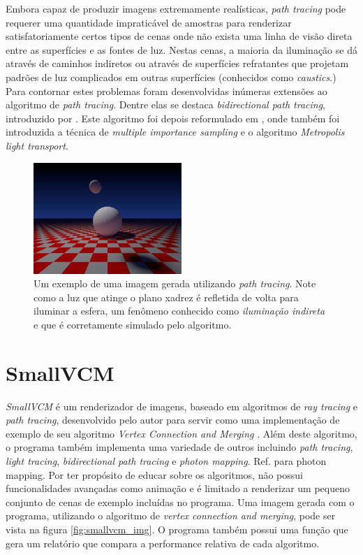 \documentclass[tg]{mdtufsm}
\newcommand{\todo}[1]{\textsf{\color{red}#1}}
\begin{document}
Embora capaz de produzir imagens extremamente realísticas, \emph{path tracing} pode requerer uma
quantidade impraticável de amostras para renderizar satisfatoriamente certos tipos de cenas onde não
exista uma linha de visão direta entre as superfícies e as fontes de luz. Nestas cenas, a maioria da
iluminação se dá através de caminhos indiretos ou através de superfícies refratantes que projetam
padrões de luz complicados em outras superfícies (conhecidos como \emph{caustics}.) Para contornar
estes problemas foram desenvolvidas inúmeras extensões ao algoritmo de \emph{path tracing}. Dentre
elas se destaca \emph{bidirectional path tracing}, introduzido por \citet{lafortune1993}. Este
algoritmo foi depois reformulado em \citep{veach1997}, onde também foi introduzida a técnica de
\emph{multiple importance sampling} e o algoritmo \emph{Metropolis light transport}.

\begin{figure}
	\centering
	\includegraphics[width=0.5\textwidth]{exemplo_imagem}
	\caption{
		Um exemplo de uma imagem gerada utilizando \emph{path tracing}. Note como a luz que atinge o
		plano xadrez é refletida de volta para iluminar a esfera, um fenômeno conhecido como
		\emph{iluminação indireta} e que é corretamente simulado pelo algoritmo.
	}
	\label{fig:path_tracing}
\end{figure}

\section{SmallVCM}

\emph{SmallVCM} \citep{smallvcm} é um renderizador de imagens, baseado em algoritmos de \emph{ray tracing} e \emph{path tracing}, desenvolvido pelo autor para servir como uma implementação de exemplo de seu algoritmo \emph{Vertex Connection and Merging} \citep{georgiev2012}. Além deste algoritmo, o programa também implementa uma variedade de outros incluindo \emph{path tracing}, \emph{light tracing}, \emph{bidirectional path tracing} e \emph{photon mapping}. \todo{Ref. para photon mapping.} Por ter propósito de educar sobre os algoritmos, não possui funcionalidades avançadas como animação e é limitado a renderizar um pequeno conjunto de cenas de exemplo incluídas no programa. Uma imagem gerada com o programa, utilizando o algoritmo de \emph{vertex connection and merging}, pode ser vista na figura \ref{fig:smallvcm_img}. O programa também possui uma função que gera um relatório que compara a performance relativa de cada algoritmo.
\end{document}
